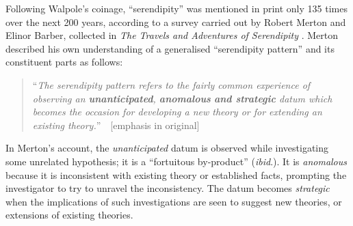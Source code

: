 Following Walpole's coinage, ``serendipity'' was mentioned in print
only 135 times over the next 200 years,
according to a survey carried out by Robert Merton and Elinor Barber, collected in \emph{The Travels and
  Adventures of Serendipity} \citep{merton}.  Merton described his own
understanding of a generalised ``serendipity pattern'' and its
constituent parts as follows:

\begin{quote}
``\emph{The serendipity pattern refers to the fairly common experience of observing an \emph{\textbf{unanticipated}}, \emph{\textbf{anomalous}} \emph{\textbf{and strategic}} datum which becomes the occasion for developing a new theory or for extending an existing theory.}''~\cite[p. 506]{merton1948bearing}~{[}emphasis in original{]}
\end{quote}
In Merton's account, the \emph{unanticipated} datum is observed while investigating some unrelated hypothesis; it is a ``fortuitous by-product'' (\emph{ibid}.). It is \emph{anomalous} because it is inconsistent with existing theory or established facts, prompting the investigator to try to unravel the inconsistency. The datum becomes \emph{strategic} when the implications of such investigations are seen to suggest new theories, or extensions of existing theories.

